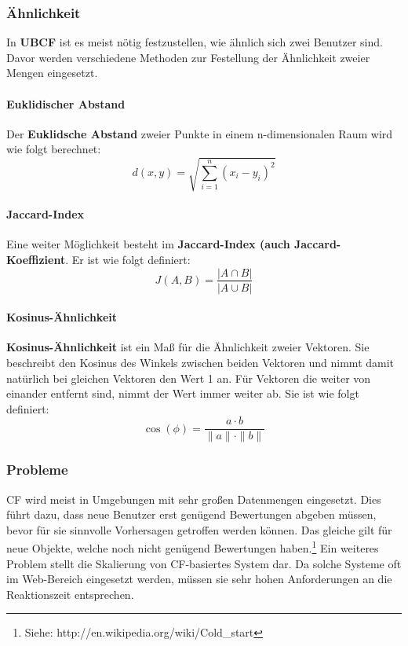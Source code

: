 \documentclass[german,a4paper]{article}
\begin{document}
\subsubsection{Ähnlichkeit}
In \textbf{UBCF} ist es meist nötig festzustellen, wie ähnlich sich zwei Benutzer sind. Davor werden verschiedene Methoden zur Festellung der Ähnlichkeit zweier Mengen eingesetzt.
\paragraph{Euklidischer Abstand}
Der \textbf{Euklidsche Abstand} zweier Punkte in einem n-dimensionalen Raum wird wie folgt berechnet:
\begin{equation}
d(x,y) = \sqrt{\displaystyle\sum_{i=1}^{n} (x_i - y_i)^2}
\end{equation}
\paragraph{Jaccard-Index}
Eine weiter Möglichkeit besteht im \textbf{Jaccard-Index (auch Jaccard-Koeffizient}. Er ist wie folgt definiert:
\begin{equation}
J(A,B) = \frac{|A \cap B|}{|A \cup B|}
\end{equation}
\paragraph{Kosinus-Ähnlichkeit}
\textbf{Kosinus-Ähnlichkeit} ist ein Maß für die Ähnlichkeit zweier Vektoren. Sie beschreibt den Kosinus des Winkels zwischen beiden Vektoren und nimmt damit natürlich bei gleichen Vektoren den Wert 1 an. Für Vektoren die weiter von einander entfernt sind, nimmt der Wert immer weiter ab. Sie ist wie folgt definiert:
\begin{equation}
\cos(\phi) = \frac{a \cdot b}{\|a\| \cdot \|b\|} 
\end{equation}
\subsubsection{Probleme}
CF wird meist in Umgebungen mit sehr großen Datenmengen eingesetzt. Dies führt dazu, dass neue Benutzer erst genügend Bewertungen abgeben müssen, bevor für sie sinnvolle Vorhersagen getroffen werden können. Das gleiche gilt für neue Objekte, welche noch nicht genügend Bewertungen haben.\footnote{Siehe: http://en.wikipedia.org/wiki/Cold\_start} Ein weiteres Problem stellt die Skalierung von CF-basiertes System dar. Da solche Systeme oft im Web-Bereich eingesetzt werden, müssen sie sehr hohen Anforderungen an die Reaktionszeit entsprechen.
\end{document}
